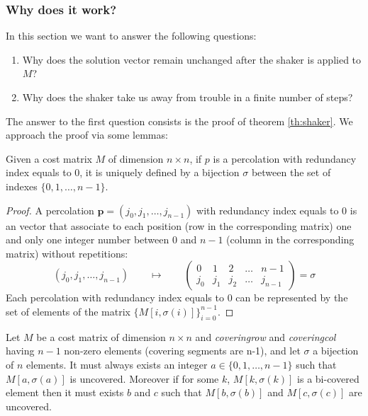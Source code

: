 \documentclass[12pt]{ClasseMatematicamente}
\begin{document}
\subsubsection*{Why does it work?}
In this section we want to answer the following questions: 
\begin{enumerate}
 \item Why does the solution vector remain unchanged after the shaker is applied to $M$?
 \item Why does the shaker take us away from trouble in a finite number of steps?
\end{enumerate}
The answer to the first question consists is the proof of theorem \ref{th:shaker}. We approach the proof via some lemmas:
\begin{lemma}
 Given a cost matrix $M$ of dimension $n\times n$, if $p$ is a percolation with redundancy index equals to $0$, it is uniquely defined by a bijection $\sigma$ between the set of indexes $\lbrace 0,1, \dots , n-1 \rbrace$. 
\end{lemma}
\begin{proof}
 A percolation $\mathbf{p} = (j_0, j_1, \dots , j_{n-1})$ with redundancy index equals to $0$ is an vector that associate to each position (row in the corresponding matrix) one and only one integer number between $0$ and $n-1$ (column in the corresponding matrix) without repetitions:
 \begin{equation*} 
(j_0, j_1, \dots , j_{n-1})
\qquad \longmapsto \qquad
\left(\begin{array}{ccccc}
0 & 1 & 2 & \dots & n-1 \\
j_0 & j_1 & j_2 & \dots & j_{n-1}
\end{array}\right) = \sigma
\end{equation*}
Each percolation with redundancy index equals to $0$ can be represented by the set of elements of the matrix $\lbrace M[i, \sigma(i)]\rbrace_{i=0}^{n-1}$.
\end{proof}
\begin{lemma}
 Let $M$ be a cost matrix of dimension $n\times n$ and \emph{covering\textunderscore row} and \emph{covering\textunderscore col} having $n-1$ non-zero elements (covering segments are n-1), and let $\sigma$ a bijection of $n$ elements. It must always exists an integer $a\in \lbrace 0,1, \dots , n-1 \rbrace$ such that $M[a, \sigma(a)]$ is uncovered.  Moreover if for some $k$, $M[k, \sigma(k)]$ is a bi-covered element then it must exists $b$ and $c$ such that $M[b, \sigma(b)]$ and $M[c, \sigma(c)]$ are uncovered. 
\end{lemma}
\end{document}

